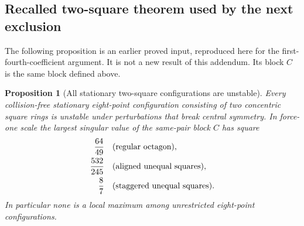 \documentclass[11pt,a4paper]{article}
\newtheorem{proposition}[theorem]{Proposition}
\theoremstyle{remark}
\begin{document}
\subsection{Recalled two-square theorem used by the next exclusion}
The following proposition is an earlier proved input, reproduced here
for the first-fourth-coefficient argument. It is not a new result of
this addendum. Its block \(C\) is the same block defined above.
\begin{proposition}[All stationary two-square configurations are unstable]
\label{prop:n8-two-square-unstable}
Every collision-free stationary eight-point configuration consisting
of two concentric square rings is unstable under perturbations that
break central symmetry. In force-one scale the largest singular value
of the same-pair block $C$ has square
\[
\begin{aligned}
 \frac{64}{49}&\quad\hbox{(regular octagon)},\\
 \frac{532}{245}&\quad\hbox{(aligned unequal squares)},\\
 \frac87&\quad\hbox{(staggered unequal squares)}.
\end{aligned}
\]
In particular none is a local maximum among unrestricted eight-point
configurations.
\end{proposition}
\end{document}
